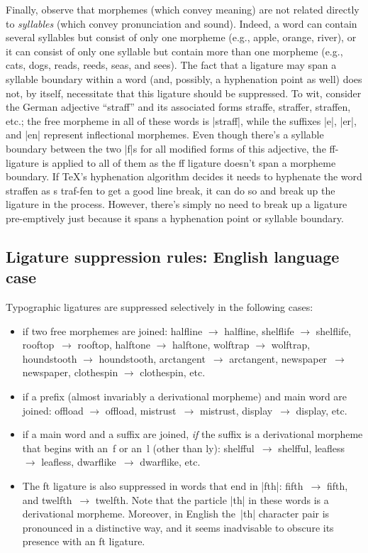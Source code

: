 \documentclass[11pt]{article}
\begin{document}
Finally, observe that morphemes (which convey meaning) are not related directly to \emph{syllables} (which convey pronunciation and sound). Indeed, a word can contain several syllables but consist of only one morpheme (e.g., apple, orange, river), or it can consist of only one syllable but contain more than one morpheme (e.g., cats, dogs, reads, reeds, seas, and sees). The fact that a ligature may span a syllable boundary within a word (and, possibly, a hyphenation point as well) does not, by itself, necessitate that this ligature should be suppressed. To wit, consider the German adjective \enquote{straff} and its associated forms straffe, straffer, straffen, etc.; the free morpheme in all of these words is |straff|, while the suffixes |e|, |er|, and |en| represent inflectional morphemes. Even though there's a syllable boundary between the two |f|s for all modified forms of this adjective, the ff-ligature is applied to all of them as the ff ligature doesn't span a morpheme boundary. If TeX's hyphenation algorithm decides it needs to hyphenate the word straffen as s\kern0pt traf-fen to get a good line break, it can do so and break up the ligature in the process. However, there's simply no need to break up a ligature pre-emptively just because it spans a hyphenation point or syllable boundary.



\subsection{Ligature suppression rules: English language case}


Typographic ligatures are suppressed selectively in the following cases:
\begin{itemize}
\item if two free morphemes are joined: \mbox{halfline} $\to$ halfline, \mbox{shelflife} $\to$ shelflife, \mbox{rooftop}~$\to$ rooftop, \mbox{halftone} $\to$ halftone, \mbox{wolftrap} $\to$ wolftrap, \mbox{houndstooth} $\to$ houndstooth, \mbox{arctan}\-gent~$\to$ arctangent, \mbox{newspaper}~$\to$ newspaper, \mbox{clothespin} $\to$ clothespin, etc.

\item if a prefix (almost invariably a derivational morpheme) and main word are joined: \mbox{offload} $\to$ offload, mi\mbox{st}rust~$\to$ mistrust, di\mbox{sp}lay~$\to$ display, etc. 

\item if a main word and a suffix are joined, \emph{if} the suffix is a derivational morpheme that begins with an~f or an~l (other than ly): \mbox{shelfful}~$\to$ shelfful, \mbox{leafless} $\to$ leafless, \mbox{dwarflike}~$\to$ dwarflike, etc. 

\item The ft ligature is also suppressed in words that end in |fth|: \mbox{fifth}~$\to$ fifth, and \mbox{twelfth}~$\to$ twelfth. Note that the particle |th| in these words is a derivational morpheme. Moreover, in English the~|th| character pair is pronounced in a distinctive way, and it seems inadvisable to obscure its presence with an ft ligature.
\end{itemize}
\end{document}
